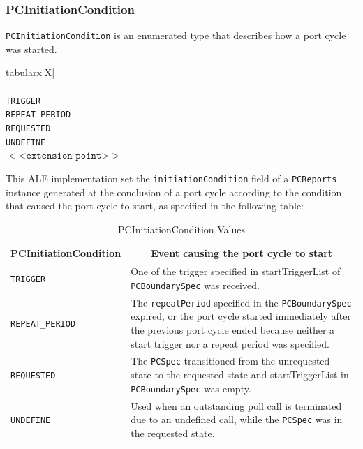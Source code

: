 \documentclass[11pt,a4paper,oneside]{article}
\newenvironment{bbox}%
{\begin{table}[h!]\begin{threeparttable}}%
{\end{threeparttable}\end{table}\FloatBarrier}
\newenvironment{bbox}
{\ifvmode\IgnorePar\fi \EndP\Tg<div class='bbox'>}{\Tg</div>\IgnoreIndent}
\begin{document}
\subsubsection{PCInitiationCondition}
\texttt{PCInitiationCondition} is an enumerated type that describes how a port cycle was started.

\begin{bbox}
\begin{edtable}{tabularx}{\linewidth}{|X|}
\hline 
{}
\\
\\
\texttt{TRIGGER}\\
\texttt{REPEAT\_PERIOD}\\
\texttt{REQUESTED}\\
\texttt{UNDEFINE}\\
$<$<$\texttt{extension point}$>$>$\\
\hline
\end{edtable}
\end{bbox}

This ALE implementation set the \texttt{initiationCondition} field of a \texttt{PCReports} instance generated at the conclusion of a port cycle according to the condition that caused the port cycle to start, as specified in the following table:

\begin{table}[!h]
\begin{tabularx}{\linewidth}{|l|X|}
\hline
\multicolumn{1}{|c|}{\textbf{PCInitiationCondition}}&
\multicolumn{1}{c|}{\textbf{Event causing the port cycle to start}}\\
\hline
\texttt{TRIGGER}&One of the trigger specified in startTriggerList of \texttt{PCBoundarySpec} was received.\\
\hline
\texttt{REPEAT\_PERIOD}&The \texttt{repeatPeriod} specified in the \texttt{PCBoundarySpec} expired, or the port cycle started immediately after the previous port cycle ended because neither a start trigger nor a repeat period was specified.\\
\hline
\texttt{REQUESTED}&The \texttt{PCSpec} transitioned from the unrequested state to the requested state and startTriggerList in \texttt{PCBoundarySpec} was empty.\\
\hline
\texttt{UNDEFINE}&Used when an outstanding poll call is terminated due to an undefined call, while the \texttt{PCSpec} was in the requested state.\\
\hline
\end{tabularx}
\caption{PCInitiationCondition Values}
\MakeLineNo
\end{table}
\FloatBarrier
\end{document}
